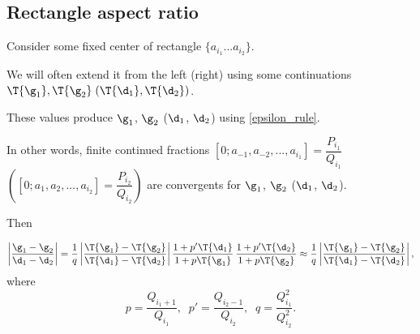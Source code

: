 \subsection{Rectangle aspect ratio}

Consider some fixed center of rectangle $\{a_{i_1} ... a_{i_2}\}$.

We will often extend it from the left (right) using some continuations
$\T{\g_1}, \T{\g_2}\; (\T{\d_1}, \T{\d_2})$.

These values produce $\g_1$, $\g_2$ ($\d_1$, $\d_2$)
using \ref{epsilon_rule}.

In other words, finite continued fractions
$[0; a_{-1}, a_{-2}, ..., a_{i_1}] = \dfrac{P_{i_1}}{Q_{i_1}}$
$\left([0; a_{1}, a_{2}, ..., a_{i_2}] = \dfrac{P_{i_2}}{Q_{i_2}}\right)$
are convergents for $\g_1$, $\g_2$ ($\d_1$, $\d_2$).

Then

\begin{equation}
	\left| \dfrac{\g_1 - \g_2}{\d_1 - \d_2} \right|
	=
	\dfrac{1}{q}
	\left| \dfrac{\T{\g_1} - \T{\g_2}}
	{\T{\d_1} - \T{\d_2}} \right|
	\dfrac{1 + p' \T{\d_1}}{1 + p \T{\g_1}}\,
	\dfrac{1 + p' \T{\d_2}}{1 + p \T{\g_2}}
	\approx
	\dfrac{1}{q}
	\left| \dfrac{\T{\g_1} - \T{\g_2}}
	{\T{\d_1} - \T{\d_2}} \right|,
\end{equation}
where
\begin{equation*}
	p = \dfrac{Q_{i_1 + 1}}{Q_{i_1}},\;\;
	p' = \dfrac{Q_{i_2 - 1}}{Q_{i_2}},\;\;
	q = \dfrac{Q_{i_1}^2}{Q_{i_2}^2}.
\end{equation*}
